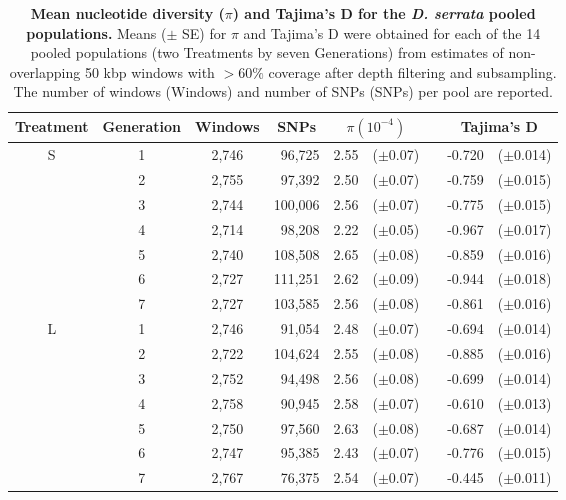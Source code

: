 \begin{table}[!htp]
\renewcommand{\arraystretch}{1.3}
\begin{center}
\caption[Mean nucleotide diversity ($\pi$) and Tajima’s D for the \textit{D. serrata} pooled populations.]{\textbf{Mean nucleotide diversity ($\pi$) and Tajima’s D for the \textit{D. serrata} pooled populations.}
Means ($\pm$ SE) for $\pi$ and Tajima’s D were obtained for each of the 14 pooled populations (two Treatments by seven Generations) from estimates of non-overlapping 50 kbp windows with $>60\%$ coverage after depth filtering and subsampling. The number of windows (Windows) and number of SNPs (SNPs) per pool are reported.}
\label{tab:FitNucDiv}
\begin{tabular}{cccrm{1.2em}lm{0.1em}rl}
\toprule
\textbf{Treatment}	& \textbf{Generation} & \textbf{Windows} & \multicolumn{1}{c}{\textbf{SNPs}} & \multicolumn{2}{c}{\bfseries{$\pi(10^{-4})$}} & & \multicolumn{2}{c}{\textbf{Tajima's D}}\\
\midrule						
S	&    1	& 2,746 &	96,725 &	2.55 & ($\pm$0.07) & &	-0.720 & ($\pm$0.014)\\
&	2 &	2,755    & 97,392	& 2.50	& ($\pm$0.07)	& & -0.759 &	($\pm$0.015)\\
&	3 &	2,744 	& 100,006	& 2.56	& ($\pm$0.07)	& & -0.775 &	($\pm$0.015)\\
&	4 &	2,714    & 98,208	& 2.22	& ($\pm$0.05)	& & -0.967 &	($\pm$0.017)\\
&	5 &	2,740 	& 108,508	& 2.65	& ($\pm$0.08)	& & -0.859 &	($\pm$0.016)\\
&	6 &	2,727 	& 111,251	& 2.62	& ($\pm$0.09)	& & -0.944 &	($\pm$0.018)\\
&	7 &	2,727 	& 103,585	& 2.56	& ($\pm$0.08)	& & -0.861 &	($\pm$0.016)\\[1.5ex]
L &	  1	&    2,746 &  91,054	& 2.48	& ($\pm$0.07)	& & -0.694 &	($\pm$0.014)\\
&	2 &	2,722 &	104,624 & 2.55  & ($\pm$0.08) & & -0.885 & ($\pm$0.016)\\
&	3 &	2,752 &	94,498 & 2.56	 & ($\pm$0.08)	& & -0.699 & ($\pm$0.014)\\
&	4 &	2,758 &	90,945 & 2.58	 & ($\pm$0.07)	& & -0.610 & ($\pm$0.013)\\
&	5 &	2,750 &	97,560 & 2.63	 & ($\pm$0.08)	& & -0.687 & ($\pm$0.014)\\
&	6 &	2,747 &	95,385 & 2.43	 & ($\pm$0.07)	& & -0.776 & ($\pm$0.015)\\
&	7 &	2,767 &	76,375 & 2.54	 & ($\pm$0.07)	& & -0.445 & ($\pm$0.011)\\
\bottomrule
\end{tabular}
\end{center}
\end{table}

\FloatBarrier

\FloatBarrier
